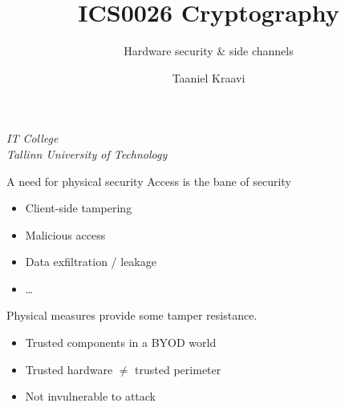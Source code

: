 

\usepackage[dvipsnames]{xcolor}

\usepackage{booktabs}

\usepackage{fancyvrb}

\usepackage{csquotes}

\usepackage{graphicx}
\graphicspath{ {../../images/} }

\usepackage{pgfplots}
\usetikzlibrary{positioning,calc,external}

\usepackage{crysymb}

\renewcommand*{\arraystretch}{1.2}

\usepackage{soul}
\usepackage[en-GB]{datetime2}

\usetikzlibrary{positioning,calc}
\graphicspath{ {../../images/} }

\title{ICS0026 Cryptography}
\subtitle{Hardware security \& side channels}
\date{}
\author{Taaniel Kraavi}
\institute%
{%
  \textit{IT College}\\
  \textit{Tallinn University of Technology}
}


\begin{frame}
  \titlepage
\end{frame}

\begin{frame}{A need for physical security}
  Access is the bane of security
  \begin{itemize}[<+(1)->]
    \item Client-side tampering
    \item Malicious access
    \item Data exfiltration / leakage
    \item \dots
  \end{itemize}

  \vspace*{1em}

  \pause
  Physical measures provide some tamper resistance.
  \begin{itemize}[<+(1)->]
    \item Trusted components in a BYOD world
    \item Trusted hardware $\neq$ trusted perimeter
    \item Not invulnerable to attack
  \end{itemize}
\end{frame}

